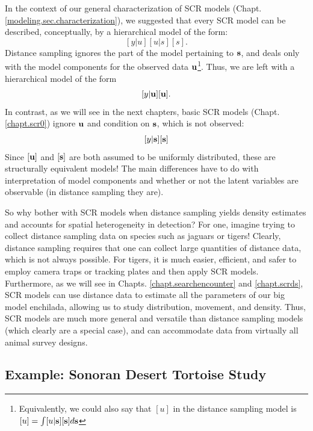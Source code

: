 In the context of our general characterization of SCR models
(Chapt. \ref{modeling.sec.characterization}),
we suggested that every SCR model can be described,
conceptually, by a hierarchical model of the form:
\[
 [y|u][u|s][s].
\]
Distance sampling ignores the part of the model pertaining to ${\bf
  s}$, and deals only with the model components for the observed
data  ${\bf u}$\footnote{Equivalently, we could also say that $[u]$ in
  the distance sampling model is $[u] = \int [u|{\bf s}][{\bf s}]
  d{\bf s}$}. Thus, we are left with a hierarchical model of the form
\[
[y|{\bf u}][{\bf u}].
\]
In contrast, as we will see in the next chapters, basic SCR models
(Chapt. \ref{chapt.scr0}) ignore ${\bf u}$ and condition on ${\bf s}$,
which is not observed:
\[
[y|{\bf s}][{\bf s}]
\]
Since $[{\bf u}]$ and $[{\bf s}]$ are both assumed to be uniformly
distributed, these are structurally equivalent models! The main
differences have to do with interpretation of model components and
whether or not the latent variables are observable (in distance
sampling they are).

So why bother with SCR models when distance sampling yields density
estimates and accounts for spatial heterogeneity in detection? For
one, imagine trying to collect distance sampling data on species such
as jaguars or tigers!  Clearly, distance sampling requires that one
can collect large quantities of distance data, which is not always
possible. For tigers, it is much easier, efficient, and safer to
employ camera traps or tracking plates and then apply SCR
models. Furthermore, as we will see in Chapts.
\ref{chapt.searchencounter} and \ref{chapt.scrds}, SCR models can use
distance data to estimate all the parameters of our big model
enchilada, allowing us to study distribution, movement, and
density. Thus, SCR models are much more general and versatile than
distance sampling models (which clearly are a special case), and can
accommodate data from virtually all animal survey designs.

\subsection{Example: Sonoran Desert Tortoise Study}

